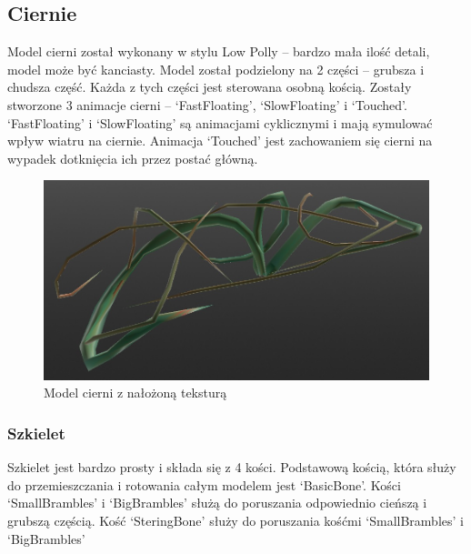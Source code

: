 \documentclass[12pt,twoside]{article}
\begin{document}
\subsection{Ciernie}
Model cierni został wykonany w stylu Low Polly -- bardzo mała ilość detali, model
może być kanciasty. Model został podzielony na 2 części -- grubsza i chudsza
część. Każda z tych części jest sterowana osobną kością. Zostały stworzone 3
animacje cierni -- `FastFloating', `SlowFloating' i `Touched'. `FastFloating'  i
`SlowFloating' są animacjami cyklicznymi i mają symulować wpływ wiatru na
ciernie. Animacja `Touched' jest zachowaniem się cierni na wypadek dotknięcia
ich przez postać główną. 
\begin{figure}[h!]
    \centering
    \includegraphics[width=12cm]{RealizacjaProjektu/Thorns/bramble_TEXT.jpg}
    \caption{Model cierni z nałożoną teksturą}
    \label{Bramble:Model}
\end{figure}
\subsubsection{Szkielet}
Szkielet jest bardzo prosty i składa się z 4 kości. Podstawową
kością, która służy do przemieszczania i rotowania całym modelem jest
`BasicBone'. Kości `SmallBrambles' i `BigBrambles' służą do poruszania
odpowiednio cieńszą i grubszą częścią. Kość `SteringBone' służy do poruszania
kośćmi `SmallBrambles' i `BigBrambles'
\end{document}
